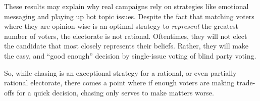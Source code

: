 These results may explain why real campaigns rely on strategies like emotional
messaging and playing up hot topic issues. Despite the fact that matching
voters where they are opinion-wise is an optimal strategy to \textit{represent}
the greatest number of voters, the electorate is not rational. Oftentimes, they
will not elect the candidate that most closely represents their beliefs.
Rather, they will make the easy, and ``good enough'' decision by single-issue
voting of blind party voting.

So, while chasing is an exceptional strategy for a rational, or even partially
rational electorate, there comes a point where if enough voters are making
trade-offs for a quick decision, chasing only serves to make matters worse. 

\pagebreak
